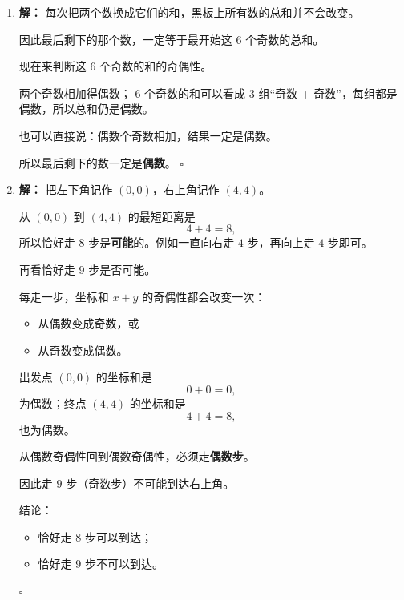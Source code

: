 \documentclass[11pt,a4paper,fontset=fandol]{ctexart}
\theoremstyle{formalexample}
\newenvironment{solution}{\par\noindent\textbf{解：}}{\hfill$\square$\par}
\begin{document}
\begin{enumerate}
\begin{solution}
  无论哪种情况，亮灯数的\textbf{奇偶性都不变}。

  初始时全灭，所以
  \[
  L=0,
  \]
  是偶数。

  因为奇偶性始终不变，所以以后任何时刻亮灯数都必须是偶数，不可能变成奇数。

  而“恰好只有 1 盏灯亮着”对应的亮灯数是 $1$，是奇数。

  因此这种情况\textbf{不可能发生}。
  \end{solution}

  \item \begin{solution}
  每次把两个数换成它们的和，黑板上所有数的总和并不会改变。

  因此最后剩下的那个数，一定等于最开始这 $6$ 个奇数的总和。

  现在来判断这 $6$ 个奇数的和的奇偶性。

  两个奇数相加得偶数；
  6 个奇数的和可以看成 3 组“奇数 + 奇数”，每组都是偶数，所以总和仍是偶数。

  也可以直接说：偶数个奇数相加，结果一定是偶数。

  所以最后剩下的数一定是\textbf{偶数}。
  \end{solution}

  \item \begin{solution}
  把左下角记作 $(0,0)$，右上角记作 $(4,4)$。

  从 $(0,0)$ 到 $(4,4)$ 的最短距离是
  \[
  4+4=8,
  \]
  所以恰好走 $8$ 步是\textbf{可能}的。例如一直向右走 $4$ 步，再向上走 $4$ 步即可。

  再看恰好走 $9$ 步是否可能。

  每走一步，坐标和 $x+y$ 的奇偶性都会改变一次：
  \begin{itemize}
    \item 从偶数变成奇数，或
    \item 从奇数变成偶数。
  \end{itemize}

  出发点 $(0,0)$ 的坐标和是
  \[
  0+0=0,
  \]
  为偶数；终点 $(4,4)$ 的坐标和是
  \[
  4+4=8,
  \]
  也为偶数。

  从偶数奇偶性回到偶数奇偶性，必须走\textbf{偶数步}。

  因此走 $9$ 步（奇数步）不可能到达右上角。

  结论：
  \begin{itemize}
    \item 恰好走 $8$ 步可以到达；
    \item 恰好走 $9$ 步不可以到达。
  \end{itemize}
  \end{solution}


\end{enumerate}
\end{document}
